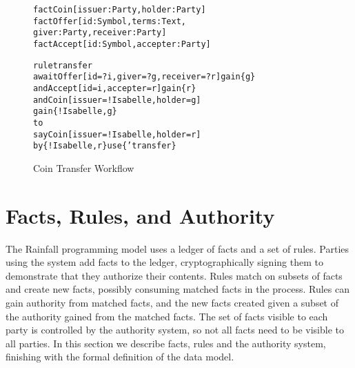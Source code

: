 
\clearpage{}

\begin{figure}
\begin{small}
\begin{alltt}
fact  Coin   [issuer: Party,  holder:   Party]
fact  Offer  [id:     Symbol, terms:    Text,
              giver:  Party,  receiver: Party]
fact  Accept [id:     Symbol, accepter: Party]

rule  transfer
await Offer  [id = ?i, giver = ?g, receiver = ?r] gain \{g\}
  and Accept [id = i,  accepter = r]              gain \{r\}
  and Coin   [issuer = !Isabelle,  holder = g]
      gain \{!Isabelle,g\}
to
  say Coin   [issuer = !Isabelle,  holder = r]
   by \{!Isabelle,r\}  use \{'transfer\}
\end{alltt}
\end{small}
\caption{Coin Transfer Workflow}
\label{f:CoinTransfer}
\end{figure}


\section{Facts, Rules, and Authority}
\label{s:FactsWeights}
The Rainfall programming model uses a ledger of facts and a set of rules. Parties using the system add facts to the ledger, cryptographically signing them to demonstrate that they authorize their contents. Rules match on subsets of facts and create new facts, possibly consuming matched facts in the process. Rules can gain authority from matched facts, and the new facts created given a subset of the authority gained from the matched facts. The set of facts visible to each party is controlled by the authority system, so not all facts need to be visible to all parties. In this section we describe facts, rules and the authority system, finishing with the formal definition of the data model.


